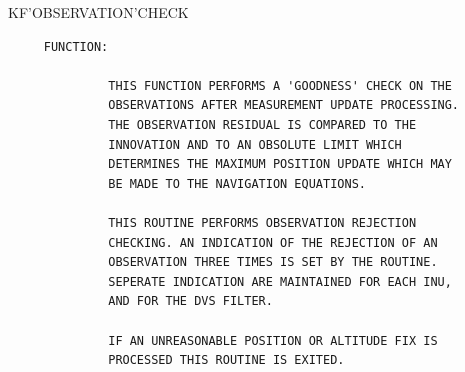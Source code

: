 \begin{frame}
KF'OBSERVATION'CHECK
\begin{verbatim}
     FUNCTION:

              THIS FUNCTION PERFORMS A 'GOODNESS' CHECK ON THE
              OBSERVATIONS AFTER MEASUREMENT UPDATE PROCESSING.
              THE OBSERVATION RESIDUAL IS COMPARED TO THE
              INNOVATION AND TO AN OBSOLUTE LIMIT WHICH
              DETERMINES THE MAXIMUM POSITION UPDATE WHICH MAY
              BE MADE TO THE NAVIGATION EQUATIONS.

              THIS ROUTINE PERFORMS OBSERVATION REJECTION
              CHECKING. AN INDICATION OF THE REJECTION OF AN
              OBSERVATION THREE TIMES IS SET BY THE ROUTINE.
              SEPERATE INDICATION ARE MAINTAINED FOR EACH INU,
              AND FOR THE DVS FILTER.

              IF AN UNREASONABLE POSITION OR ALTITUDE FIX IS
              PROCESSED THIS ROUTINE IS EXITED.

\end{verbatim}
\end{frame}
